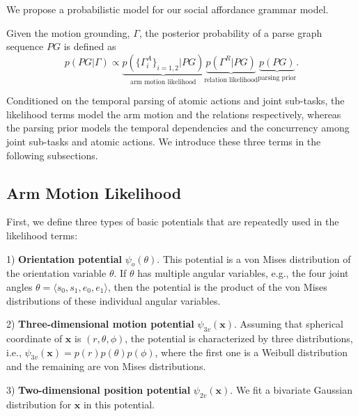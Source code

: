 \documentclass[letterpaper, 10 pt, conference]{ieeeconf}  %
\def \xb{\bm{x}} %
\begin{document}
We propose a probabilistic model for our social affordance grammar model. 

Given the motion grounding, $\Gamma$, the posterior probability of a parse graph sequence $PG$ is defined as
\begin{equation}
 p(PG | \Gamma)\propto \underbrace{p(\{\Gamma_i^A\}_{i=1,2} | PG)}_{\text{arm motion likelihood}} \underbrace{p(\Gamma^R | PG)}_{\text{relation likelihood}} \underbrace{p(PG)}_{\text{parsing prior}}.
\label{eq:posterior}
\end{equation}

Conditioned on the temporal parsing of atomic actions and joint sub-tasks, the likelihood terms model the arm motion and the relations respectively, whereas the parsing prior models the temporal dependencies and the concurrency among joint sub-tasks and atomic actions. We introduce these three terms in the following subsections.

\subsection{Arm Motion Likelihood}

First, we define three types of basic potentials that are repeatedly used in the likelihood terms:

1) \textbf{Orientation potential} $\psi_o(\theta)$. This potential is a von Mises distribution of the orientation variable $\theta$. If $\theta$ has multiple angular variables, e.g., the four joint angles $\theta = \langle s_0, s_1, e_0, e_1\rangle$, then the potential is the product of the von Mises distributions of these individual angular variables.

2) \textbf{Three-dimensional motion potential} $\psi_{3v}(\xb)$. Assuming that spherical coordinate of $\xb$ is $(r,\theta,\phi)$, the potential is characterized by three distributions, i.e., $\psi_{3v}(\xb) = p(r)p(\theta)p(\phi)$, where the first one is a Weibull distribution and the remaining are von Mises distributions.

3) \textbf{Two-dimensional position potential} $\psi_{2v}(\xb)$. We fit a bivariate Gaussian distribution for $\xb$ in this potential. %
\end{document}
